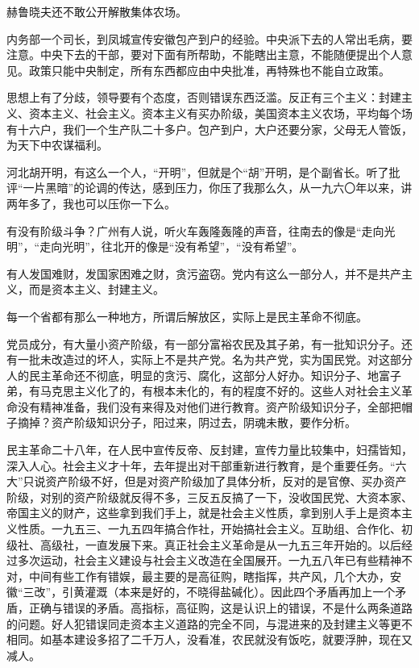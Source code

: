 赫鲁晓夫还不敢公开解散集体农场。

内务部一个司长，到凤城宣传安徽包产到户的经验。中央派下去的人常出毛病，要注意。中央下去的干部，要对下面有所帮助，不能瞎出主意，不能随便提出个人意见。政策只能中央制定，所有东西都应由中央批准，再特殊也不能自立政策。

思想上有了分歧，领导要有个态度，否则错误东西泛滥。反正有三个主义：封建主义、资本主义、社会主义。资本主义有买办阶级，美国资本主义农场，平均每个场有十六户，我们一个生产队二十多户。包产到户，大户还要分家，父母无人管饭，为天下中农谋福利。

河北胡开明，有这么一个人，“开明”，但就是个“胡”开明，是个副省长。听了批评“一片黑暗”的论调的传达，感到压力，你压了我那么久，从一九六〇年以来，讲两年多了，我也可以压你一下么。

有没有阶级斗争？广州有人说，听火车轰隆轰隆的声音，往南去的像是“走向光明”，“走向光明”，往北开的像是“没有希望”，“没有希望”。

有人发国难财，发国家困难之财，贪污盗窃。党内有这么一部分人，并不是共产主义，而是资本主义、封建主义。

每一个省都有那么一种地方，所谓后解放区，实际上是民主革命不彻底。

党员成分，有大量小资产阶级，有一部分富裕农民及其子弟，有一批知识分子。还有一批未改造过的坏人，实际上不是共产党。名为共产党，实为国民党。对这部分人的民主革命还不彻底，明显的贪污、腐化，这部分人好办。知识分子、地富子弟，有马克思主义化了的，有根本未化的，有的程度不好的。这些人对社会主义革命没有精神准备，我们没有来得及对他们进行教育。资产阶级知识分子，全部把帽子摘掉？资产阶级知识分子，阳过来，阴过去，阴魂未散，要作分析。

民主革命二十八年，在人民中宣传反帝、反封建，宣传力量比较集中，妇孺皆知，深入人心。社会主义才十年，去年提出对干部重新进行教育，是个重要任务。“六大”只说资产阶级不好，但是对资产阶级加了具体分析，反对的是官僚、买办资产阶级，对别的资产阶级就反得不多，三反五反搞了一下，没收国民党、大资本家、帝国主义的财产，这些拿到我们手上，就是社会主义性质，拿到别人手上是资本主义性质。一九五三、一九五四年搞合作社，开始搞社会主义。互助组、合作化、初级社、高级社，一直发展下来。真正社会主义革命是从一九五三年开始的。以后经过多次运动，社会主义建设与社会主义改造在全国展开。一九五八年已有些精神不对，中间有些工作有错娱，最主要的是高征购，瞎指挥，共产风，几个大办，安徽“三改”，引黄灌溉（本来是好的，不晓得盐碱化）。因此四个矛盾再加上一个矛盾，正确与错误的矛盾。高指标，高征购，这是认识上的错误，不是什么两条道路的问题。好人犯错误同走资本主义道路的完全不同，与混进来的及封建主义等更不相同。如基本建设多招了二千万人，没看准，农民就没有饭吃，就要浮肿，现在又减人。

